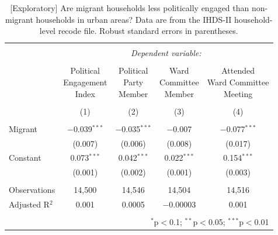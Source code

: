 \documentclass[
  11.5pt,
]{article}
\begin{document}
\begin{table}[!htbp] \centering 
  \caption{[Exploratory] Are migrant households less politically engaged than non-migrant households in urban areas? Data are from the IHDS-II household-level recode file. Robust standard errors in parentheses.} 
  \label{tab:ihds2_political_engagement_urban} 
\small 
\begin{tabular}{@{\extracolsep{5pt}}lcccc} 
\\[-1.8ex]\hline 
\hline \\[-1.8ex] 
 & \multicolumn{4}{c}{\textit{Dependent variable:}} \\ 
\cline{2-5} 
\\[-1.8ex] & \shortstack{Political \\ Engagement \\ Index} & \shortstack{Political \\ Party \\ Member} & \shortstack{Ward \\ Committee \\ Member} & \shortstack{Attended \\ Ward Committee \\ Meeting} \\ 
\\[-1.8ex] & (1) & (2) & (3) & (4)\\ 
\hline \\[-1.8ex] 
 Migrant & $-$0.039$^{***}$ & $-$0.035$^{***}$ & $-$0.007 & $-$0.077$^{***}$ \\ 
  & (0.007) & (0.006) & (0.008) & (0.017) \\ 
  Constant & 0.073$^{***}$ & 0.042$^{***}$ & 0.022$^{***}$ & 0.154$^{***}$ \\ 
  & (0.001) & (0.002) & (0.001) & (0.003) \\ 
 \hline \\[-1.8ex] 
Observations & 14,500 & 14,546 & 14,504 & 14,516 \\ 
Adjusted R$^{2}$ & 0.001 & 0.0005 & $-$0.00003 & 0.001 \\ 
\hline 
\hline \\[-1.8ex] 
\multicolumn{5}{r}{$^{*}$p$<$0.1; $^{**}$p$<$0.05; $^{***}$p$<$0.01} \\ 
\end{tabular} 
\end{table}
\end{document}
